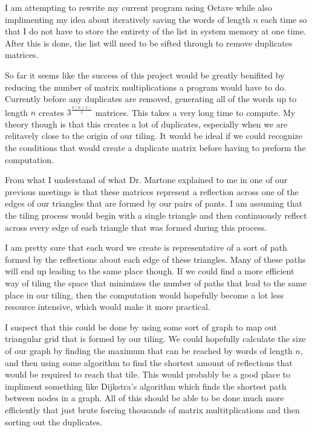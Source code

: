 \documentclass{amsart}
\begin{document}
I am attempting to rewrite my current program using Octave while also implimenting my idea about iteratively saving the words of length $n$ each time so that I do not have to store the entirety of the list in system memory at one time. After this is done, the list will need to be sifted through to remove duplicates matrices. 

So far it seems like the success of this project would be greatly benifited by reducing the number of matrix multiplications a program would have to do. Currently before any duplicates are removed, generating all of the words up to length $n$ creates $3^{\frac{n(n+1)}{2}}$ matrices. This takes a very long time to compute. My theory though is that this creates a lot of duplicates, especially when we are relitavely close to the origin of our tiling. It would be ideal if we could recognize the conditions that would create a duplicate matrix before having to preform the computation.

From what I understand of what Dr. Martone explained to me in one of our previous meetings is that these matrices represent a reflection across one of the edges of our triangles that are formed by our pairs of pants. I am assuming that the tiling process would begin with a single triangle and then continuously reflect across every edge of each triangle that was formed during this process. 

I am pretty sure that each word we create is representative of a sort of path formed by the reflections about each edge of these triangles. Many of these paths will end up leading to the same place though.  If we could find a more efficient way of tiling the space that minimizes the number of paths that lead to the same place in our tiling, then the computation would hopefully become a lot less resource intensive, which would make it more practical. 

I suspect that this could be done by using some sort of graph to map out triangular grid that is formed by our tiling. We could hopefully calculate the size of our graph by finding the maximum  that can be reached by words of length $n$, and then using some algorithm to find the shortest amount of reflections that would be required to reach that tile. This would probably be a good place to impliment something like Dijkstra's algorithm which finds the shortest path between nodes in a graph. All of this should be able to be done much more efficiently that just brute forcing thousands of matrix multitplications and then sorting out the duplicates. 
\end{document}
